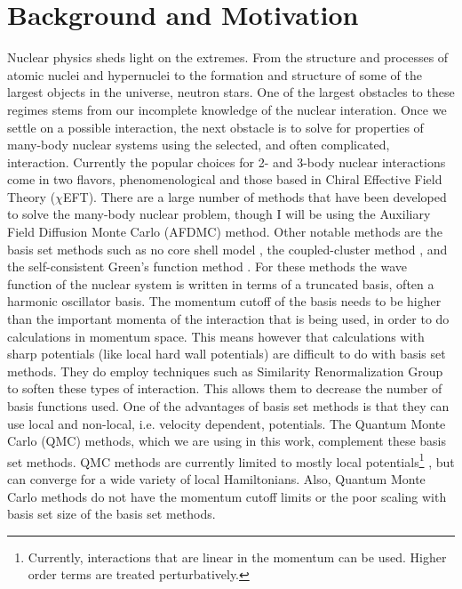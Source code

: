 \section{Background and Motivation}
Nuclear physics sheds light on the extremes. From the structure and processes of atomic nuclei and hypernuclei to the formation and structure of some of the largest objects in the universe, neutron stars. One of the largest obstacles to these regimes stems from our incomplete knowledge of the nuclear interation. Once we settle on a possible interaction, the next obstacle is to solve for properties of many-body nuclear systems using the selected, and often complicated, interaction. Currently the popular choices for 2- and 3-body nuclear interactions come in two flavors, phenomenological and those based in Chiral Effective Field Theory ($\chi$EFT). There are a large number of methods that have been developed to solve the many-body nuclear problem, though I will be using the Auxiliary Field Diffusion Monte Carlo (AFDMC) method. Other notable methods are the basis set methods such as no core shell model \cite{navratil2009,barrett2013}, the coupled-cluster method \cite{hagen2014}, and the self-consistent Green's function method \cite{dickhoff2004,soma2014}. For these methods the wave function of the nuclear system is written in terms of a truncated basis, often a harmonic oscillator basis. The momentum cutoff of the basis needs to be higher than the important momenta of the interaction that is being used, in order to do calculations in momentum space. This means however that calculations with sharp potentials (like local hard wall potentials) are difficult to do with basis set methods. They do employ techniques such as Similarity Renormalization Group \cite{hergert2016} to soften these types of interaction. This allows them to decrease the number of basis functions used. One of the advantages of basis set methods is that they can use local and non-local, i.e. velocity dependent, potentials. The Quantum Monte Carlo (QMC) methods, which we are using in this work, complement these basis set methods. QMC methods are currently limited to mostly local potentials\footnote{Currently, interactions that are linear in the momentum can be used. Higher order terms are treated perturbatively.} \cite{lynn2012}, but can converge for a wide variety of local Hamiltonians. Also, Quantum Monte Carlo methods do not have the momentum cutoff limits or the poor scaling with basis set size of the basis set methods. 

